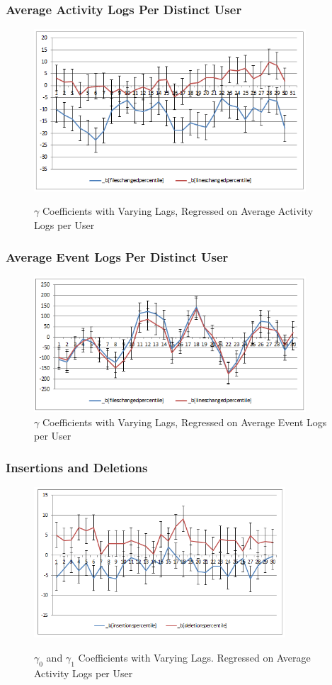 \documentclass[xcolor=pdftex,dvipsnames,table]{beamer}
\begin{document}
\frame
{
    \frametitle{Average Activity Logs Per Distinct User}
    \begin{figure}[h!]
    \centering
    \includegraphics[width=4in]{pictures/avg_activities_time_coefficients.png}
    \label{fig:avg-activities-time-coefficients}
    \caption{$\gamma$ Coefficients with Varying Lags, Regressed on Average Activity Logs per User}
    \end{figure}
}

\frame
{
    \frametitle{Average Event Logs Per Distinct User}
    \begin{figure}[h!]
    \centering
    \includegraphics[width=4in]{pictures/avg_events_time_coefficients.png}
    \caption{$\gamma$ Coefficients with Varying Lags, Regressed on Average Event Logs per User}
    \label{fig:avg-events-time-coefficients}
    \end{figure}
}

\frame
{
    \frametitle{Insertions and Deletions}
    \begin{figure}[h!]
    \centering
    \includegraphics[width=3.7in]{pictures/commit_percentiles_time_coefficients.png}
    \label{fig:insertions-deletions-time-coefficients}
    \caption{$\gamma_0$ and $\gamma_1$ Coefficients with Varying Lags. Regressed on Average Activity Logs per User}
    \centering
    \end{figure}
}
\end{document}
